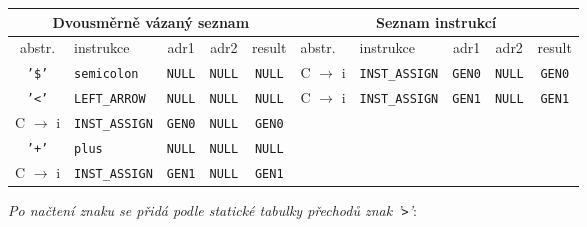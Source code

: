 \documentclass[12pt,a4paper,titlepage,final]{article}
\begin{document}
    \begin{small}
      \noindent
      \begin{tabular}{|c|l|c|c|c||l|l|c|c|c|}

        \multicolumn{5}{c}{Dvousměrně vázaný seznam} &
        \multicolumn{5}{c}{Seznam instrukcí} \\

        \hline

        abstr. & instrukce & adr1 & adr2 & result &
        abstr. & instrukce & adr1 & adr2 & result \\

        \hline

        \texttt{'\$'} & \texttt{semicolon} & \texttt{NULL} &
        \texttt{NULL} & \texttt{NULL} & 
        C $\rightarrow$ i & \texttt{INST\_ASSIGN} & \texttt{GEN0} &
        \texttt{NULL} & \texttt{GEN0} \\

        \texttt{'<'} & \texttt{LEFT\_ARROW} & \texttt{NULL} &
        \texttt{NULL} & \texttt{NULL} &
        C $\rightarrow$ i & \texttt{INST\_ASSIGN} & \texttt{GEN1} &
        \texttt{NULL} & \texttt{GEN1} \\

        C $\rightarrow$ i & \texttt{INST\_ASSIGN} & \texttt{GEN0} &
        \texttt{NULL} & \texttt{GEN0} & & & & & \\

        \texttt{'+'} & \texttt{plus} & \texttt{NULL} &
        \texttt{NULL} & \texttt{NULL} & & & & & \\

        C $\rightarrow$ i & \texttt{INST\_ASSIGN} & \texttt{GEN1} &
        \texttt{NULL} & \texttt{GEN1} & & & & & \\

        \hline

      \end{tabular}
    \end{small}

    \noindent
    \textit{Po načtení znaku se přidá podle statické tabulky přechodů znak 
    '\texttt{>}'}:
\end{document}
